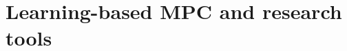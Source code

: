\section{Learning-based MPC and research tools}
\cite{web::lrhc_boston_dyn}
\cite{frameworks:mittal2023orbit}
\cite{frameworks:howell2022}
\cite{mpc_learn:hewing2020learning}